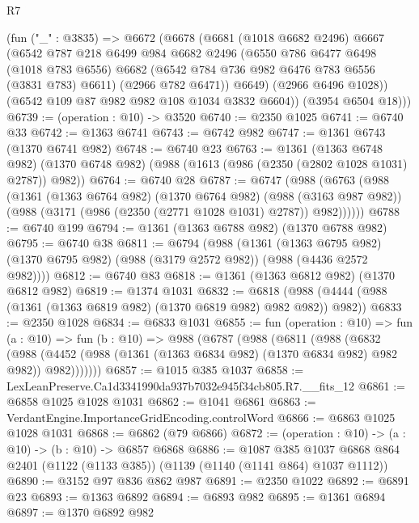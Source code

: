 \begin{lexlean}{R7}
\begin{coremodule}
      (fun ("_" : @3835) =>
      @6672
        (@6678
          (@6681
            (@1018 @6682 @2496)
            @6667
            (@6542
              @787
              @218
              @6499
              @984
              @6682
              @2496
              (@6550
                @786
                @6477
                @6498
                (@1018 @783 @6556)
                @6682
                (@6542 @784 @736 @982 @6476 @783 @6556 (@3831 @783) @6611)
                (@2966 @782 @6471))
              @6649)
            (@2966 @6496 @1028))
          (@6542 @109 @87 @982 @982 @108 @1034 @3832 @6604))
        (@3954 @6504 @18)))
@6739 := (operation : @10) -> @3520
@6740 := @2350 @1025
@6741 := @6740 @33
@6742 := @1363 @6741
@6743 := @6742 @982
@6747 := @1361 @6743 (@1370 @6741 @982)
@6748 := @6740 @23
@6763 := @1361
    (@1363 @6748 @982)
    (@1370 @6748 @982)
    (@988 (@1613 (@986 (@2350 (@2802 @1028 @1031) @2787)) @982))
@6764 := @6740 @28
@6787 := @6747
    (@988
      (@6763
        (@988
          (@1361
            (@1363 @6764 @982)
            (@1370 @6764 @982)
            (@988 (@3163 @987 @982))
            (@988 (@3171 (@986 (@2350 (@2771 @1028 @1031) @2787)) @982))))))
@6788 := @6740 @199
@6794 := @1361 (@1363 @6788 @982) (@1370 @6788 @982)
@6795 := @6740 @38
@6811 := @6794
    (@988
      (@1361
        (@1363 @6795 @982)
        (@1370 @6795 @982)
        (@988 (@3179 @2572 @982))
        (@988 (@4436 @2572 @982))))
@6812 := @6740 @83
@6818 := @1361 (@1363 @6812 @982) (@1370 @6812 @982)
@6819 := @1374 @1031
@6832 := @6818 (@988 (@4444 (@988 (@1361 (@1363 @6819 @982) (@1370 @6819 @982) @982 @982)) @982))
@6833 := @2350 @1028
@6834 := @6833 @1031
@6855 := fun (operation : @10) =>
  fun (a : @10) =>
  fun (b : @10) =>
  @988
    (@6787
      (@988
        (@6811
          (@988
            (@6832
              (@988
                (@4452 (@988 (@1361 (@1363 @6834 @982) (@1370 @6834 @982) @982 @982)) @982)))))))
@6857 := @1015 @385 @1037
@6858 := LexLeanPreserve.Ca1d3341990da937b7032e945f34cb805.R7.__fits_12
@6861 := @6858 @1025 @1028 @1031
@6862 := @1041 @6861
@6863 := VerdantEngine.ImportanceGridEncoding.controlWord
@6866 := @6863 @1025 @1028 @1031
@6868 := @6862 (@79 @6866)
@6872 := (operation : @10) -> (a : @10) -> (b : @10) -> @6857 @6868
@6886 := @1087
    @385
    @1037
    @6868
    @864
    @2401
    (@1122 (@1133 @385))
    (@1139 (@1140 (@1141 @864) @1037 @1112))
@6890 := @3152 @97 @836 @862 @987
@6891 := @2350 @1022
@6892 := @6891 @23
@6893 := @1363 @6892
@6894 := @6893 @982
@6895 := @1361 @6894
@6897 := @1370 @6892 @982

\end{coremodule}
\end{lexlean}
